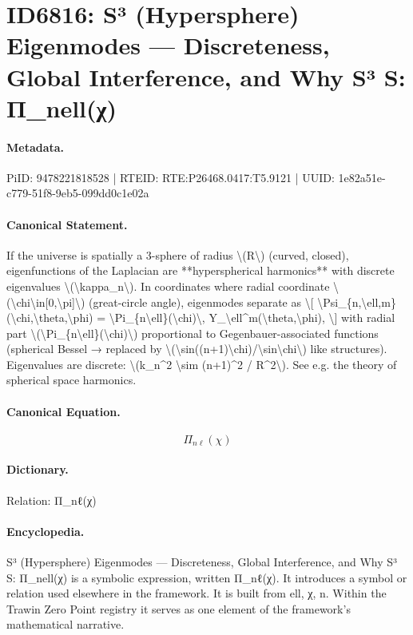 \section*{ID6816: S³ (Hypersphere) Eigenmodes — Discreteness, Global Interference, and Why S³ S: Π\_nell(χ)}
\paragraph{Metadata.}
PiID: 9478221818528 | RTEID: RTE:P26468.0417:T5.9121 | UUID: 1e82a51e-c779-51f8-9eb5-099dd0c1e02a

\paragraph{Canonical Statement.}
If the universe is spatially a 3-sphere of radius \textbackslash{}(R\textbackslash{}) (curved, closed), eigenfunctions of the Laplacian are **hyperspherical harmonics** with discrete eigenvalues \textbackslash{}(\textbackslash{}kappa\_n\textbackslash{}). In coordinates where radial coordinate \textbackslash{}(\textbackslash{}chi\textbackslash{}in[0,\textbackslash{}pi]\textbackslash{}) (great-circle angle), eigenmodes separate as \textbackslash{}[ \textbackslash{}Psi\_\{n,\textbackslash{}ell,m\}(\textbackslash{}chi,\textbackslash{}theta,\textbackslash{}phi) = \textbackslash{}Pi\_\{n\textbackslash{}ell\}(\textbackslash{}chi)\textbackslash{}, Y\_\textbackslash{}ell\textasciicircum{}m(\textbackslash{}theta,\textbackslash{}phi), \textbackslash{}] with radial part \textbackslash{}(\textbackslash{}Pi\_\{n\textbackslash{}ell\}(\textbackslash{}chi)\textbackslash{}) proportional to Gegenbauer-associated functions (spherical Bessel → replaced by \textbackslash{}(\textbackslash{}sin((n+1)\textbackslash{}chi)/\textbackslash{}sin\textbackslash{}chi\textbackslash{}) like structures). Eigenvalues are discrete: \textbackslash{}(k\_n\textasciicircum{}2 \textbackslash{}sim (n+1)\textasciicircum{}2 / R\textasciicircum{}2\textbackslash{}). See e.g. the theory of spherical space harmonics.

\paragraph{Canonical Equation.}
\[
\Pi_{n\ell}(\chi)
\]

\paragraph{Dictionary.}
Relation: Π\_nℓ(χ)

\paragraph{Encyclopedia.}
S³ (Hypersphere) Eigenmodes — Discreteness, Global Interference, and Why S³ S: Π\_nell(χ) is a symbolic expression, written Π\_nℓ(χ). It introduces a symbol or relation used elsewhere in the framework. It is built from ell, χ, n. Within the Trawin Zero Point registry it serves as one element of the framework's mathematical narrative.
